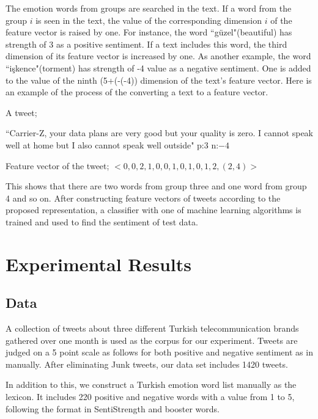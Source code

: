 \documentclass[12pt]{article}
\begin{document}
The emotion words from groups are searched in the text. If a word from the group $i$ is seen in the text, the value of the corresponding dimension $i$ of the feature vector is raised by one. For instance, the word ``g\"{u}zel"(beautiful) has
strength of 3 as a positive sentiment. If a text includes this word, the third dimension of its feature vector is increased by one. As another example, the word ``i\c{s}kence"(torment) has strength of -4 value
as a negative sentiment. One is added to the value of the ninth (5+(-(-4)) dimension of the text's feature vector. Here is an example of the process of the converting
a text to a feature vector.

A tweet;

``Carrier-Z, your data plans are very good but your quality is zero.
I cannot speak well at home but I also cannot speak well outside" p:3
n:$-4$

Feature vector of the tweet; $<0,0,2,1,0,0,1,0,1,0,1,2,(2,4)>$

This shows that there are two words from group three and one word from group 4 and so on. After constructing feature vectors of tweets
according to the proposed representation, a classifier with one of machine learning algorithms is trained and used to find the sentiment of test data.


\section{Experimental Results}
\subsection{Data}

A collection of tweets about three different Turkish telecommunication brands gathered over one month is used as the corpus for our experiment. Tweets are judged on a 5 point scale as
follows for both positive and negative sentiment as in \cite{2} manually.
After eliminating Junk tweets, our data set includes 1420 tweets.

In addition to this, we construct a Turkish emotion word list manually as the lexicon. It includes 220 positive and negative words with a value from 1 to 5, following the format in
SentiStrength \cite{2} and booster words. 
\end{document}
